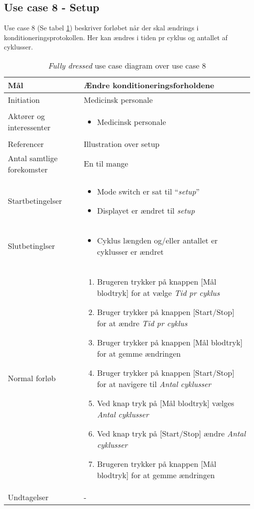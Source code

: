 	\subsection{Use case 8 - Setup}
	Use case 8 (Se tabel \ref{tab:uc8}) beskriver forløbet når der skal ændrings i konditioneringsprotokollen. Her kan ændres i tiden pr cyklus og antallet af cyklusser. 
		\begin{table}[H]
				\begin{center}
			\begin{tabular}{ | p{} | p{}| } 
				\hline
				Mål & Ændre konditioneringsforholdene \\ 
				\hline
				Initiation &  Medicinsk personale\\
				\hline
				Aktører og interessenter & 
				\begin{itemize}
					\item Medicinsk personale 
				\end{itemize} \\ 
				\hline
				Referencer & Illustration over setup \\ 
				\hline
				Antal samtlige forekomster & En til mange \\ 
				\hline	
				Startbetingelser & 
				\begin{itemize}
					\item Mode switch er sat til “\textit{setup}” 
					\item Displayet er ændret til \textit{setup}
 				\end{itemize} \\ 
				\hline
				Slutbetinglser & 
				\begin{itemize}
					\item Cyklus længden og/eller antallet er cyklusser er ændret
				\end{itemize} \\ 
				\hline
				Normal forløb & \begin{enumerate}
					\setlength\itemsep{0cm} %
					\item Brugeren trykker på knappen [Mål blodtryk]  for at vælge \textit{Tid pr cyklus}
					\item Bruger trykker på knappen [Start/Stop] for at ændre \textit{Tid pr cyklus}
					\item Bruger trykker på knappen [Mål blodtryk]  for at gemme ændringen
					\item Bruger trykker på knappen [Start/Stop] for at navigere til \textit{Antal cyklusser}
					\item Ved knap tryk på [Mål blodtryk]  vælges \textit{Antal cyklusser}
					\item Ved knap tryk på [Start/Stop] ændre \textit{Antal cyklusser}
					\item Brugeren trykker på knappen [Mål blodtryk] for at gemme ændringen
				\end{enumerate} \\ 
				\hline
				Undtagelser & -  \\ 
				\hline
			\end{tabular}
		\end{center}

			\caption{\textit{Fully dressed} use case diagram over use case 8} \label{tab:uc8}
		\end{table}
			\newpage
